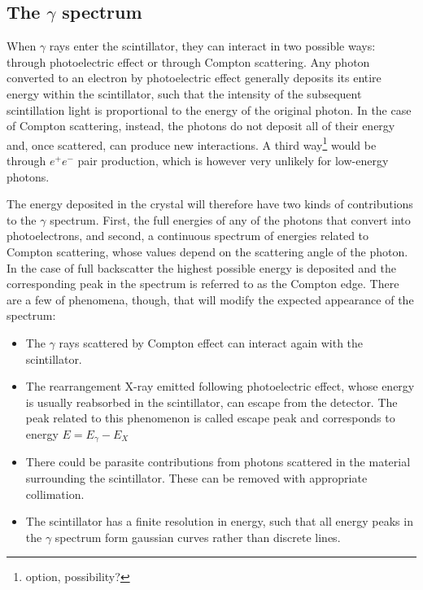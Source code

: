 \subsection{The $\gamma$ spectrum}
\label{sec:spectrum}

When $\gamma$ rays enter the scintillator, they can interact in two possible ways: through photoelectric effect or through Compton scattering.
Any photon converted to an electron by photoelectric effect generally deposits its entire energy within the scintillator, such that the intensity of the subsequent scintillation light is proportional to the energy of the original photon.
In the case of Compton scattering, instead, the photons do not deposit all of their energy and, once scattered, can produce new interactions.
A third way\footnote{option, possibility?} would be through $e^+ e^-$ pair production, which is however very unlikely for low-energy photons.

The energy deposited in the crystal will therefore have two kinds of contributions to the $\gamma$ spectrum.
First, the full energies of any of the photons that convert into photoelectrons, and 
second, a continuous spectrum of energies related to Compton scattering, 
whose values depend on the scattering angle of the photon.
In the case of full backscatter the highest possible energy is deposited
and the corresponding peak in the spectrum is referred to as the Compton edge.
There are a few of phenomena, though, that will modify the expected appearance of the spectrum:
\begin{itemize}
    \item The $\gamma$ rays scattered by Compton effect can interact again with the scintillator.
    \item The rearrangement X-ray emitted following photoelectric effect, whose energy is usually reabsorbed in the scintillator, can escape from the detector.
    The peak related to this phenomenon is called escape peak and corresponds to energy $E = E_{\gamma} - E_X$
    \item There could be parasite contributions from photons scattered in the material surrounding the scintillator. 
    These can be removed with appropriate collimation.
    \item The scintillator has a finite resolution in energy, such that all energy peaks in the $\gamma$ spectrum form gaussian curves rather than discrete lines.
\end{itemize}


